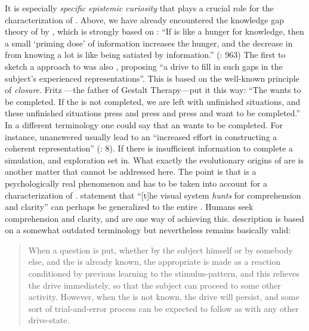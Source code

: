 \noindent It is especially \textit{specific epistemic curiosity} that plays a crucial role for the characterization of . Above, we have already encountered the knowledge gap theory of  by \citet{Loewenstein1994}, which is strongly based on : “If  is like a hunger for knowledge, then a small ‘priming dose’ of information increases the hunger, and the decrease in  from knowing a lot is like being satiated by information.” (\citealt{Kang2009}: 963) The first to sketch a  approach to  was also \citet[181]{Berlyne1954}, proposing “a drive to fill in such gaps in the subject’s experienced representations”. This is based on the well-known  principle of \textit{closure}. Fritz \citet[119]{Perls1973}---the father of Gestalt Therapy---put it this way: “The  wants to be completed. If the  is not completed, we are left with unfinished situations, and these unfinished situations press and press and press and want to be completed.” In a different terminology one could say that an  wants to be completed. For instance, unanswered  usually lead to an “increased effort in constructing a coherent representation” (\citealt{Hoeks2013}: 8). If there is insufficient information to complete a simulation,  and exploration set in. What exactly the evolutionary origins of  are is another matter that cannot be addressed here. The point is that  is a psychologically real phenomenon and has to be taken into account for a characterization of .  statement that “[t]he visual system \textit{hunts} for comprehension and clarity” can perhaps be generalized to the entire . Humans seek comprehension and clarity, and  are one way of achieving this.  description is based on a somewhat outdated terminology but nevertheless remains basically valid:

\begin{quote}
When a question is put, whether by the subject himself or by somebody else, and the  is already known, the appropriate  is made as a reaction conditioned by previous learning to the stimulus-pattern, and this relieves the drive immediately, so that the subject can proceed to some other activity. However, when the  is not known, the drive will persist, and some sort of trial-and-error process can be expected to follow as with any other drive-state.
\end{quote}

